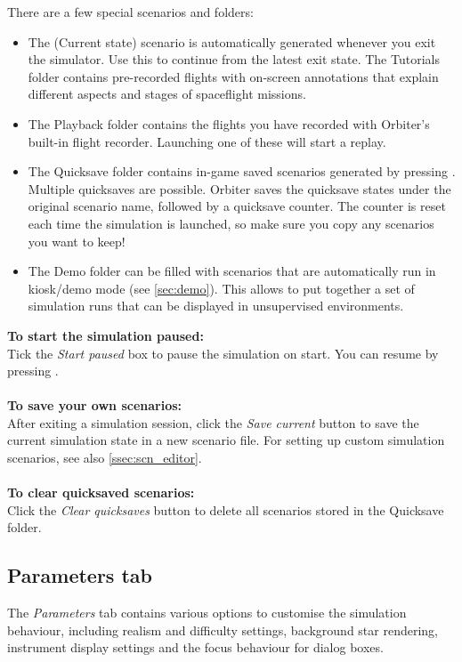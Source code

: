 \documentclass[Orbiter User Manual.tex]{subfiles}
\begin{document}
\begin{figure}[H]
	\centering
\end{figure}

\noindent
There are a few special scenarios and folders:

\begin{itemize}
\item The (Current state) scenario is automatically generated whenever you exit the simulator. Use this to continue from the latest exit state.
The Tutorials folder contains pre-recorded flights with on-screen annotations that explain different aspects and stages of spaceflight missions.
\item The Playback folder contains the flights you have recorded with Orbiter's built-in flight recorder. Launching one of these will start a replay.
\item The Quicksave folder contains in-game saved scenarios generated by pressing \Ctrl{}. Multiple quicksaves are possible. Orbiter saves the quicksave states under the original scenario name, followed by a quicksave counter. The counter is reset each time the simulation is launched, so make sure you copy any scenarios you want to keep!
\item The Demo folder can be filled with scenarios that are automatically run in kiosk/demo mode (see \ref{sec:demo}). This allows to put together a set of simulation runs that can be displayed in unsupervised environments.
\end{itemize}

\noindent
\textbf{To start the simulation paused:}\\
Tick the \textit{Start paused} box to pause the simulation on start. You can resume by pressing \Ctrl{}.\\
\\
\textbf{To save your own scenarios:}\\
After exiting a simulation session, click the \textit{Save current} button to save the current simulation state in a new scenario file. For setting up custom simulation scenarios, see also \ref{ssec:scn_editor}.\\
\\
\textbf{To clear quicksaved scenarios:}\\
Click the \textit{Clear quicksaves} button to delete all scenarios stored in the Quicksave folder.


\subsection{Parameters tab}
\label{ssec:parameters_tab}
The \textit{Parameters} tab contains various options to customise the simulation behaviour, including realism and difficulty settings, background star rendering, instrument display settings and the focus behaviour for dialog boxes.
\end{document}
